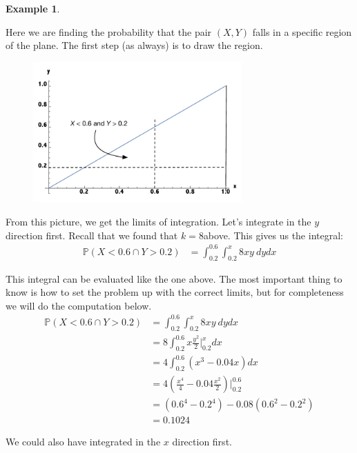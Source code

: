 \documentclass[12pt]{article}
\theoremstyle{definition}
\newtheorem*{example}{Example}
\theoremstyle{remark}
\def\P{{\mathbb P}}
\begin{document}
\begin{example}
\begin{enumerate}
Here we are finding the probability that the pair $(X, Y)$ falls in a specific region of the plane. The first step (as always) is to draw the region.
\begin{figure}[H]
\centering
\includegraphics[width=8cm]{region1prob.pdf}
\end{figure}
From this picture, we get the limits of integration. Let's integrate in the $y$ direction first. Recall that we found that $k = 8$above. This gives us the integral:
\begin{align*}
\P(X < 0.6 \cap Y > 0.2) &= \int_{0.2}^{0.6} \int_{0.2}^x 8 x y \: dy dx
\end{align*}

This integral can be evaluated like the one above. The most important thing to know is how to set the problem up with the correct limits, but for completeness we will do the computation below.
\begin{align*}
\P(X < 0.6 \cap Y > 0.2) &= \int_{0.2}^{0.6} \int_{0.2}^x 8 x y \: dy dx \\
&= 8 \int_{0.2}^{0.6} x \frac{y^2}{2} \Bigr|_{0.2}^x dx \\
&= 4 \int_{0.2}^{0.6} (x^3 - 0.04x) dx \\
&= 4 \left( \frac{x^4}{4} - 0.04 \frac{x^2}{2} \right)\Bigr|_{0.2}^{0.6}\\
&= \left(0.6^4 - 0.2^4\right) - 0.08\left(0.6^2 - 0.2^2\right) \\
&= 0.1024
\end{align*}

We could also have integrated in the $x$ direction first.
\end{enumerate}
\end{example}
\end{document}
